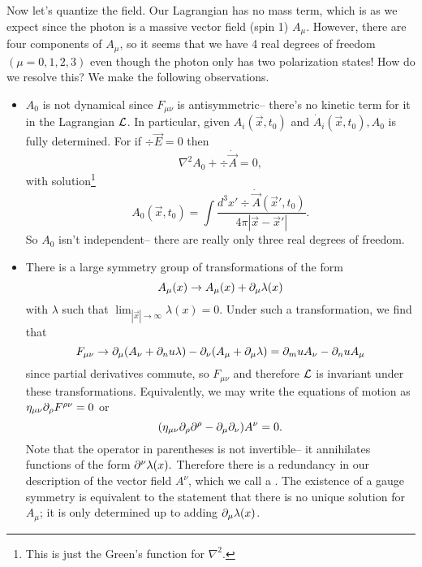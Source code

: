 Now let's quantize the field. Our Lagrangian has no mass term, which is as we expect since the photon is a massive vector field (spin 1) $A_\mu$. However, there are four components of $A_\mu$, so it seems that we have 4 real degrees of freedom $(\mu=0,1,2,3)$ even though the photon only has two polarization states! How do we resolve this? We make the following observations.
\begin{itemize}
    \item $A_0$ is not dynamical since $F_{\mu\nu}$ is antisymmetric-- there's no kinetic term for it in the Lagrangian $\mathcal L$. In particular, given $A_i(\vec x,t_0)$ and $\dot A_i(\vec x,t_0), A_0$ is fully determined. For if $\div \vec E=0$ then
    $$\nabla^2 A_0 +\div \dot{\vec A}=0,$$
    with solution\footnote{This is just the Green's function for $\nabla^2$.}
    \begin{equation}\label{a0solution}
        A_0(\vec x,t_0)=\int \frac{d^3x' \div \dot{\vec A}(\vec x',t_0)}{4\pi|\vec x-\vec x'|}.
    \end{equation}
    So $A_0$ isn't independent-- there are really only three real degrees of freedom.
    \item There is a large symmetry group of transformations of the form
    $$A_\mu(x)\to A_\mu(x)+\partial_\mu \lambda(x)$$
    with $\lambda$ such that $\lim_{|\vec x|\to \infty }\lambda(x)=0$. Under such a transformation, we find that
    $$F_{\mu\nu}\to \partial_\mu(A_\nu+\partial_nu \lambda)-\partial_\nu(A_\mu+\partial_\mu\lambda)=\partial_mu A_\nu -\partial_nu A_\mu$$
    since partial derivatives commute, so $F_{\mu\nu}$ and therefore $\mathcal L$ is invariant under these transformations. Equivalently, we may write the equations of motion as $\eta_{\mu\nu}\partial_\rho F^{\rho\nu}=0$ or
    $$(\eta_{\mu\nu}\partial_\rho \partial^\rho -\partial_\mu \partial_\nu)A^\nu =0.$$
    Note that the operator in parentheses is not invertible-- it annihilates functions of the form $\partial^\nu \lambda(x).$ Therefore there is a redundancy in our description of the vector field $A^\nu$, which we call a . The existence of a gauge symmetry is equivalent to the statement that there is no unique solution for $A_\mu$; it is only determined up to adding $\partial_\mu \lambda(x)$.
\end{itemize}

